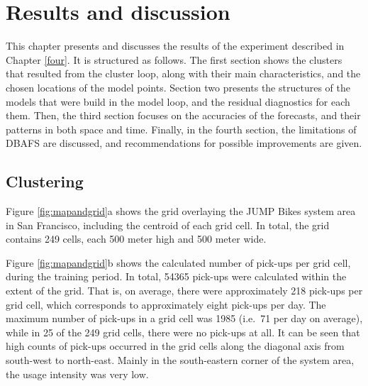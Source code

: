 \documentclass[12pt,oneside]{reedthesis}
\begin{document}
\chapter{Results and discussion}\label{five}

This chapter presents and discusses the results of the experiment
described in Chapter \ref{four}. It is structured as follows. The first
section shows the clusters that resulted from the cluster loop, along
with their main characteristics, and the chosen locations of the model
points. Section two presents the structures of the models that were
build in the model loop, and the residual diagnostics for each them.
Then, the third section focuses on the accuracies of the forecasts, and
their patterns in both space and time. Finally, in the fourth section,
the limitations of DBAFS are discussed, and recommendations for possible
improvements are given.

\section{Clustering}\label{clustering}

Figure \ref{fig:mapandgrid}a shows the grid overlaying the JUMP Bikes
system area in San Francisco, including the centroid of each grid cell.
In total, the grid contains 249 cells, each 500 meter high and 500 meter
wide.

Figure \ref{fig:mapandgrid}b shows the calculated number of pick-ups per
grid cell, during the training period. In total, 54365 pick-ups were
calculated within the extent of the grid. That is, on average, there
were approximately 218 pick-ups per grid cell, which corresponds to
approximately eight pick-ups per day. The maximum number of pick-ups in
a grid cell was 1985 (i.e.~71 per day on average), while in 25 of the
249 grid cells, there were no pick-ups at all. It can be seen that high
counts of pick-ups occurred in the grid cells along the diagonal axis
from south-west to north-east. Mainly in the south-eastern corner of the
system area, the usage intensity was very low.
\end{document}
